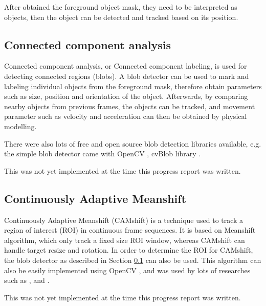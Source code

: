 After obtained the foreground object mask, they need to be interpreted as objects, then the object can be detected and tracked based on its position.

\subsection{Connected component analysis} \label{blob}

Connected component analysis, or Connected component labeling, is used for detecting connected regions (blobs). A blob detector can be used to mark and labeling individual objects from the foreground mask, therefore obtain parameters such as size, position and orientation of the object. Afterwards, by comparing nearby objects from previous frames, the objects can be tracked, and movement parameter such as velocity and acceleration can then be obtained by physical modelling.

There were also lots of free and open source blob detection libraries available, e.g. the simple blob detector came with OpenCV \cite{opencv:blob}, cvBlob library \cite{cvblob}.

This was not yet implemented at the time this progress report was written.

\subsection{Continuously Adaptive Meanshift}

Continuously Adaptive Meanshift (CAMshift) \cite{bradski1998computer} is a technique used to track a region of interest (ROI) in continuous frame sequences. It is based on Meanshift algorithm, which only track a fixed size ROI window, whereas CAMshift can handle target resize and rotation. In order to determine the ROI for CAMshift, the blob detector as described in Section \ref{blob} can also be used. This algorithm can also be easily implemented using OpenCV \cite{opencv:camshift}, and was used by lots of researches such as \cite{chu2007object}, \cite{xu2012moving} and \cite{nouar2006improved}.

This was not yet implemented at the time this progress report was written.
